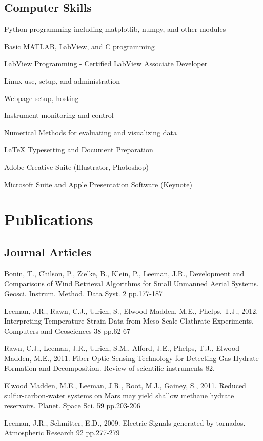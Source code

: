 \documentclass[letterpaper]{article}
\renewenvironment{itemize}{
  \begin{list}{}{
    \setlength{\leftmargin}{1.5em}
  }
}{
  \end{list}
}
\begin{document}
\subsection*{Computer Skills}

\begin{itemize}
\item Python programming including matplotlib, numpy, and other modules 
\item Basic MATLAB, LabView, and C programming
\item LabView Programming - Certified LabView Associate Developer
\item Linux use, setup, and administration
\item Webpage setup, hosting
\item Instrument monitoring and control
\item Numerical Methods for evaluating and visualizing data
\item \LaTeX{} Typesetting and Document Preparation
\item Adobe Creative Suite (Illustrator, Photoshop)
\item Microsoft Suite and Apple Presentation Software (Keynote)
\end{itemize}



\section*{Publications}

\subsection*{Journal Articles}

\begin{itemize}

\item Bonin, T., Chilson, P., Zielke, B., Klein, P., Leeman, J.R., Development and Comparisons of Wind Retrieval Algorithms for Small Unmanned Aerial Systems. Geosci. Instrum. Method. Data Syst. 2 pp.177-187

\item Leeman, J.R., Rawn, C.J., Ulrich, S., Elwood Madden, M.E., Phelps, T.J., 2012.  Interpreting Temperature Strain Data from Meso-Scale Clathrate Experiments. Computers and Geosciences 38 pp.62-67

\item Rawn, C.J., Leeman, J.R., Ulrich, S.M., Alford, J.E., Phelps, T.J., Elwood Madden, M.E., 2011. Fiber Optic Sensing Technology for Detecting Gas Hydrate Formation and Decomposition. Review of scientific instruments 82.

\item Elwood Madden, M.E., Leeman, J.R., Root, M.J., Gainey, S., 2011. Reduced sulfur-carbon-water systems on Mars may yield shallow methane hydrate reservoirs. Planet. Space Sci. 59 pp.203-206

\item Leeman, J.R., Schmitter, E.D., 2009. Electric Signals generated by tornados. Atmospheric Research 92 pp.277-279

\end{itemize}
\end{document}
